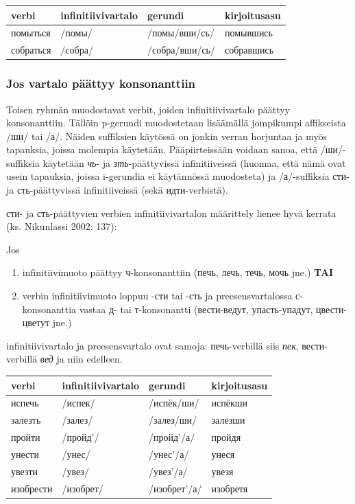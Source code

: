 \documentclass[]{scrreprt}
\providecommand{\tightlist}{%
  \setlength{\itemsep}{0pt}\setlength{\parskip}{0pt}}
\begin{document}
\begin{longtable}[c]{@{}llll@{}}
\toprule
verbi & infinitiivivartalo & gerundi & kirjoitusasu\tabularnewline
\midrule
\endhead
помыться & /помы/ & /помы/вши/сь/ & помывшись\tabularnewline
собраться & /собра/ & /собра/вши/сь/ & собравшись\tabularnewline
\bottomrule
\end{longtable}

\subsubsection{Jos vartalo päättyy
konsonanttiin}\label{jos-vartalo-puxe4uxe4ttyy-konsonanttiin}

Toisen ryhmän muodostavat verbit, joiden infinitiivivartalo päättyy
konsonanttiin. Tällöin p-gerundi muodostetaan lisäämällä jompikumpi
affikseista /ши/ tai /а/. Näiden suffiksien käytössä on jonkin verran
horjuntaa ja myös tapauksia, joissa molempia käytetään. Pääpiirteissään
voidaan sanoa, että /ши/-suffiksia käytetään \emph{чь}- ja
\emph{зть}-päättyvissä infinitiiveissä (huomaa, että nämä ovat usein
tapauksia, joissa i-gerundia ei käytännössä muodosteta) ja /а/-suffiksia
сти- ja сть-päättyvissä infinitiiveissä (sekä идти-verbistä).

сти- ja сть-päättyvien verbien infinitiivivartalon määrittely lienee
hyvä kerrata (ks. Nikunlassi 2002: 137):

Jos

\begin{enumerate}
\def\labelenumi{\alph{enumi}.}
\tightlist
\item
  infinitiivimuoto päättyy ч-konsonanttiin (печь, лечь, течь, мочь jne.)
  \textbf{TAI}
\item
  verbin infinitiivimuoto loppuu -сти tai -сть ja preesensvartalossa
  с-konsonanttia vastaa д- tai т-konsonantti (вести-ведут,
  упасть-упадут, цвести-цветут jne.)
\end{enumerate}

infinitiivivartalo ja preesensvartalo ovat samoja: печь-verbillä siis
\emph{пек}, вести-verbillä \emph{вед} ja niin edelleen.

\begin{longtable}[c]{@{}llll@{}}
\toprule
verbi & infinitiivivartalo & gerundi & kirjoitusasu\tabularnewline
\midrule
\endhead
испечь & /испек/ & /испёк/ши/ & испёкши\tabularnewline
залезть & /залез/ & /залез/ши/ & залезши\tabularnewline
пройти & /пройд'/ & /пройд'/а/ & пройдя\tabularnewline
унести & /унес/ & /унес'/а/ & унеся\tabularnewline
увезти & /увез/ & /увез'/а/ & увезя\tabularnewline
изобрести & /изобрет/ & /изобрет'/а/ & изобретя\tabularnewline
\bottomrule
\end{longtable}
\end{document}

